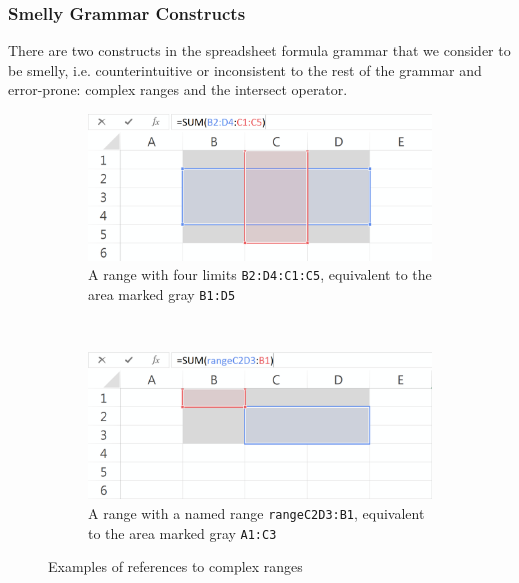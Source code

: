 \documentclass[times]{smrauth}
\begin{document}
\subsubsection{Smelly Grammar Constructs}
There are two constructs in the spreadsheet formula grammar that we consider to be smelly, i.e. counterintuitive or inconsistent to the rest of the grammar and error-prone: complex ranges and the intersect operator.
\begin{figure}
	\centering
	\begin{subfigure}[b]{0.47\textwidth}
		\centering
		\includegraphics[width=1\textwidth]{img/complexRanges}
		\caption{A range with four limits \texttt{B2:D4:C1:C5}, equivalent to the area marked gray \texttt{B1:D5}}
		\label{fig:complexA}
	\end{subfigure}
	~ %
	\begin{subfigure}[b]{0.47\textwidth}
		\centering
		\includegraphics[width=1\textwidth]{img/complexNamedRanges}
		\caption{A range with a named range \texttt{rangeC2D3:B1}, equivalent to the area marked gray \texttt{A1:C3}}
		\label{fig:complexB}
	\end{subfigure}
	\caption{Examples of references to complex ranges}\label{Figure:ComplexRanges}
\end{figure}
\end{document}
